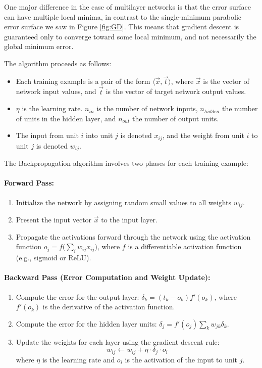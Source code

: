 \documentclass{article}
\begin{document}
One major difference in the case of multilayer networks is that the error surface can have multiple local minima, in contrast to the single-minimum parabolic error surface we saw in Figure \ref{fig:GD}. This means that gradient descent is guaranteed only to converge toward some local minimum, and not necessarily the global minimum error.

The algorithm proceeds as follows:

\begin{itemize}
    \item Each training example is a pair of the form $\langle \Vec{x}, \Vec{t} \rangle$, where $\Vec{x}$ is the vector of network input values, and $\Vec{t}$ is the vector of target network output values.
    \item $\eta$ is the learning rate. $n_{in}$ is the number of network inputs, $n_{hidden}$ the number of units in the hidden layer, and $n_{out}$ the number of output units.
    \item The input from unit $i$ into unit $j$ is denoted $x_{ij}$, and the weight from unit $i$ to unit $j$ is denoted $w_{ij}$.
\end{itemize}

The Backpropagation algorithm involves two phases for each training example:

\paragraph{Forward Pass:} 
\begin{enumerate}
    \item Initialize the network by assigning random small values to all weights $w_{ij}$.
    \item Present the input vector $\Vec{x}$ to the input layer.
    \item Propagate the activations forward through the network using the activation function $o_j = f\big( \sum_i w_{ij} x_{ij} \big)$, where $f$ is a differentiable activation function (e.g., sigmoid or ReLU).
\end{enumerate}

\paragraph{Backward Pass (Error Computation and Weight Update):}
\begin{enumerate}
    \item Compute the error for the output layer: $\delta_k = (t_k - o_k)f'(o_k)$, where $f'(o_k)$ is the derivative of the activation function.
    \item Compute the error for the hidden layer units: $\delta_j = f'(o_j) \sum_k w_{jk} \delta_k$.
    \item Update the weights for each layer using the gradient descent rule:
    \begin{equation}
        w_{ij} \leftarrow w_{ij} + \eta \cdot \delta_j \cdot o_i
    \end{equation}
    where $\eta$ is the learning rate and $o_i$ is the activation of the input to unit $j$.
\end{enumerate}
\end{document}

